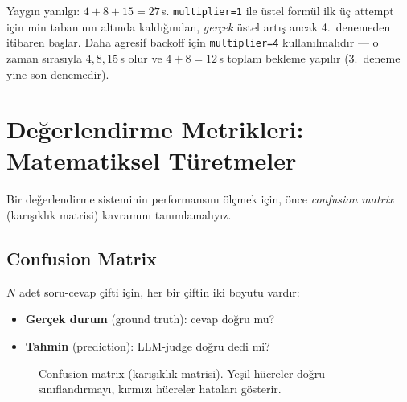 \begin{kritik}
Yayg{\i}n yan{\i}lg{\i}: $4 + 8 + 15 = 27$\,s. \texttt{multiplier=1} ile \"{u}stel form\"{u}l ilk \"{u}\c{c} attempt i\c{c}in min taban{\i}n{\i}n alt{\i}nda kald{\i}\u{g}{\i}ndan, \emph{ger\c{c}ek} \"{u}stel art{\i}\c{s} ancak 4.\ denemeden itibaren ba\c{s}lar. Daha agresif backoff i\c{c}in \texttt{multiplier=4} kullan{\i}lmal{\i}d{\i}r --- o zaman s{\i}ras{\i}yla $4, 8, 15$\,s olur ve $4+8=12$\,s toplam bekleme yap{\i}l{\i}r (3.\ deneme yine son denemedir).
\end{kritik}

\section{De\u{g}erlendirme Metrikleri: Matematiksel T\"{u}retmeler}
\label{sec:eval-metrics}

Bir de\u{g}erlendirme sisteminin performans{\i}n{\i} \"{o}l\c{c}mek i\c{c}in, \"{o}nce \emph{confusion matrix} (kar{\i}\c{s}{\i}kl{\i}k matrisi) kavram{\i}n{\i} tan{\i}mlamal{\i}y{\i}z.

\subsection{Confusion Matrix}

$N$ adet soru-cevap \c{c}ifti i\c{c}in, her bir \c{c}iftin iki boyutu vard{\i}r:
\begin{itemize}
  \item \textbf{Ger\c{c}ek durum} (ground truth): cevap do\u{g}ru mu?
  \item \textbf{Tahmin} (prediction): LLM-judge do\u{g}ru dedi mi?
\end{itemize}

\begin{figure}[H]
\centering
{}
\caption{Confusion matrix (kar{\i}\c{s}{\i}kl{\i}k matrisi). Ye\c{s}il h\"{u}creler do\u{g}ru s{\i}n{\i}fland{\i}rmay{\i}, k{\i}rm{\i}z{\i} h\"{u}creler hatalar{\i} g\"{o}sterir.}
\label{fig:confusion-matrix}
\end{figure}

